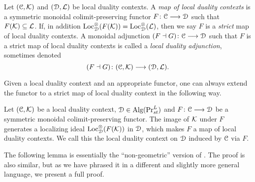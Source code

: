 \begin{definition}
    Let $(\EuScript{C}, \mathcal{K})$ and $(\EuScript{D}, \mathcal{L})$ be local duality contexts. A \emph{map of local duality contexts} is a symmetric monoidal colimit-preserving functor $F\colon \EuScript{C}\longrightarrow \EuScript{D}$ such that $F(\mathcal{K})\subseteq \mathcal{L}$. If, in addition $\operatorname{Loc}_{\EuScript{D}}^\otimes(F(\mathcal{K})) = \operatorname{Loc}_{\EuScript{D}}^\otimes(\mathcal{L})$, then we say $F$ is a \emph{strict} map of local duality contexts. A monoidal adjunction $(F\dashv G)\colon \EuScript{C}\longrightarrow \EuScript{D}$ such that $F$ is a strict map of local duality contexts is called a \emph{local duality adjunction}, sometimes denoted 
    \[(F\dashv G)\colon (\EuScript{C}, \mathcal{K})\longrightarrow (\EuScript{D}, \mathcal{L}).\]
\end{definition}

Given a local duality context and an appropriate functor, one can always extend the functor to a strict map of local duality context in the following way. 

\begin{construction}
    Let $(\EuScript{C}, \mathcal{K})$ be a local duality context, $\EuScript{D} \in \operatorname{Alg}(\mathrm{Pr}_{st}^L)$ and $F\colon \EuScript{C}\longrightarrow \EuScript{D}$ be a symmetric monoidal colimit-preserving functor. The image of $\mathcal{K}$ under $F$ generates a localizing ideal $\operatorname{Loc}^\otimes_{\EuScript{D}}(F(\mathcal{K}))$ in $\EuScript{D}$, which makes $F$ a map of local duality contexts. We call this the local duality context on $\EuScript{D}$ induced by $\EuScript{C}$ via $F$. 
\end{construction}

The following lemma is essentially the ``non-geometric'' version of \cite[5.11]{balmer-sanders_2017}. The proof is also similar, but as we have phrased it in a different and slightly more general language, we present a full proof. 

